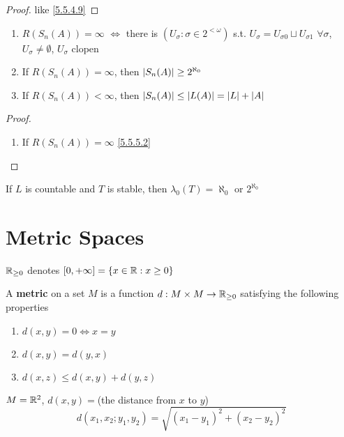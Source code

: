 \documentclass[11pt]{article}
\begin{document}
\begin{proof}
like \ref{5.5.4.9}
\end{proof}

\begin{lemma}[]
\begin{enumerate}
\item \(R(S_n(A))=\infty\) \(\Leftrightarrow\) there is \((U_\sigma:\sigma\in 2^{<\omega})\)
s.t. \(U_\sigma=U_{\sigma 0}\sqcup U_{\sigma 1}\) \(\forall\sigma\), \(U_\sigma\neq\emptyset\), \(U_\sigma\) clopen
\item If \(R(S_n(A))=\infty\), then \(\abs{S_n(A)}\ge 2^{\aleph_0}\)
\item If \(R(S_n(A))<\infty\), then \(\abs{S_n(A)}\le\abs{L(A)}=\abs{L}+\abs{A}\)
\end{enumerate}
\end{lemma}

\begin{proof}
\begin{enumerate}
\item If \(R(S_n(A))=\infty\) \ref{5.5.5.2}
\end{enumerate}
\end{proof}

\begin{theorem}[]
If \(L\) is countable and \(T\) is stable, then \(\lambda_0(T)=\aleph_0\) or \(2^{\aleph_0}\)
\end{theorem}



\appendix
\section{Metric Spaces}
\label{sec:org1cfe280}
\(\mathbb{R}_{\ge 0}\) denotes \([0,+\infty]=\{x\in\mathbb{R}:x\ge 0\}\)
\begin{definition}[]
A \textbf{metric} on a set \(M\) is a function \(d:M\times M\to\mathbb{R}_{\ge 0}\) satisfying the following properties
\begin{enumerate}
\item \(d(x,y)=0\Leftrightarrow x=y\)
\item \(d(x,y)=d(y,x)\)
\item \(d(x,z)\le d(x,y)+d(y,z)\)
\end{enumerate}
\end{definition}

\begin{examplle}[]
\(M=\mathbb{R}^2\), \(d(x,y)=\)(the distance from \(x\) to \(y\))
\begin{equation*}
  d(x_1,x_2;y_1,y_2)=\sqrt{(x_1-y_1)^2+(x_2-y_2)^2}
\end{equation*}
\end{examplle}
\end{document}
